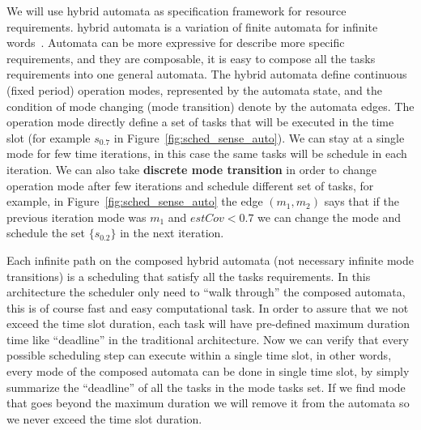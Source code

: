 \documentclass[11pt]{article}
\begin{document}
We will use hybrid automata as specification framework for resource requirements.
hybrid automata is a variation of finite automata for infinite words~\cite{hybrid-systems}.
Automata can be more expressive for describe more specific requirements, and they are composable, it is easy to compose all the tasks requirements into one general automata.
The hybrid automata define continuous (fixed period) operation modes, represented by the automata state, and the condition of mode changing (mode transition) denote by the automata edges.
The operation mode directly define a set of tasks that will be executed in the time slot (for example $s_{0.7}$ in Figure~\ref{fig:sched_sense_auto}).
We can stay at a single mode for few time iterations, in this case the same tasks will be schedule in each iteration. 
We can also take \textbf{discrete mode transition} in order to change operation mode after few iterations and schedule different set of tasks, for example, in Figure~\ref{fig:sched_sense_auto} the edge $(m_1,m_2)$ says that if the previous iteration mode was $m_1$ and $estCov < 0.7$ we can change the mode and schedule the set $\{s_{0.2}\}$ in the next iteration.

Each infinite path on the composed hybrid automata (not necessary infinite mode transitions) is a scheduling that satisfy all the tasks requirements. 
In this architecture the scheduler only need to ``walk through'' the composed automata, this is of course fast and easy computational task. 
In order to assure that we not exceed the time slot duration, each task will have pre-defined maximum duration time like ``deadline'' in the traditional architecture. Now we can verify that every possible scheduling step can execute within a single time slot, in other words, every mode of the composed automata can be done in single time slot, by simply summarize the ``deadline'' of all the tasks in the mode tasks set.
If we find mode that goes beyond the maximum duration we will remove it from the automata so we never exceed the time slot duration.
\end{document}
